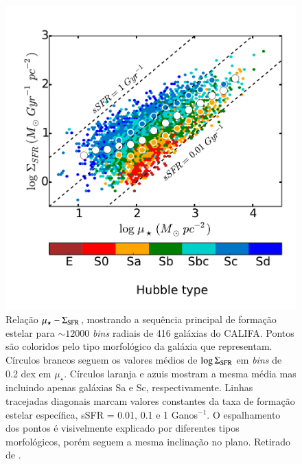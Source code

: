 \begin{figure}
  \includegraphics[scale=0.65]{figuras/Fig_MSSF_local_Vmax_Bgsd6e.pdf}
  \caption[$\log \Sigma_{SFR}\ \times\ \log \mu_\star$]
{Relação $\mu_\star-\Sigma_{\rm SFR}$, mostrando a sequência principal de formação estelar para $\sim 12000$ {\em bins} radiais de 416 galáxias do CALIFA. Pontos são coloridos pelo tipo morfológico da galáxia que representam. Círculos brancos seguem os valores médios de $\log \Sigma_{\rm SFR}$ em {\em bins} de 0.2 dex em $\mu_\star$. Círculos laranja e azuis mostram a mesma média mas incluindo apenas galáxias Sa e Sc, respectivamente. Linhas tracejadas diagonais marcam valores constantes da taxa de formação estelar específica, sSFR = 0.01, 0.1 e 1 Ganos$^{-1}$. O espalhamento dos pontos é visivelmente explicado por diferentes tipos morfológicos, porém seguem a mesma inclinação no plano.  Retirado de \citet{GonzalezDelgado.etal.2016a}.}
  \label{fig:SFRSD_McorSD_bins}
\end{figure}

